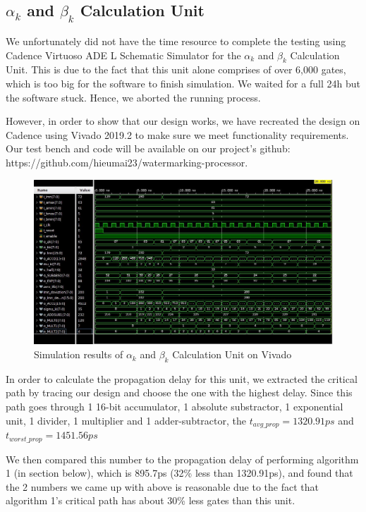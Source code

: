 \documentclass[letterpaper, 11pt]{article}
\begin{document}
	\subsection{$\alpha_k$ and $\beta_k$ Calculation Unit}
	\label{subsec:akbk}
	
	We unfortunately did not have the time resource to complete the testing using Cadence Virtuoso ADE L Schematic Simulator for the $\alpha_k$ and $\beta_k$ Calculation Unit. This is due to the fact that this unit alone comprises of over 6,000 gates, which is too big for the software to finish simulation. We waited for a full 24h but the software stuck. Hence, we aborted the running process. 
	
	However, in order to show that our design works, we have recreated the design on Cadence using Vivado 2019.2 to make sure we meet functionality requirements. Our test bench and code will be available on our project's github: https://github.com/hieumai23/watermarking-processor.
	
	\begin{figure}[htb!]
		\centering
		\includegraphics[width=0.85\linewidth]{report_pics/alpha_beta_vivado.jpg}
		\caption{Simulation results of $\alpha_k$ and $\beta_k$ Calculation Unit on Vivado}
		\label{fig38}
	\end{figure}
	\newpage
	In order to calculate the propagation delay for this unit, we extracted the critical path by tracing our design and choose the one with the highest delay. Since this path goes through 1 16-bit accumulator, 1 absolute substractor, 1 exponential unit, 1 divider, 1 multiplier and 1 adder-subtractor, the $t_{avg\_prop} = 1320.91ps$ and $t_{worst\_prop} = 1451.56ps$
	
	We then compared this number to the propagation delay of performing algorithm 1 (in section below), which is 895.7ps (32\% less than 1320.91ps), and found that the 2 numbers we came up with above is reasonable due to the fact that algorithm 1's critical path has about 30\% less gates than this unit.
	
\end{document}
